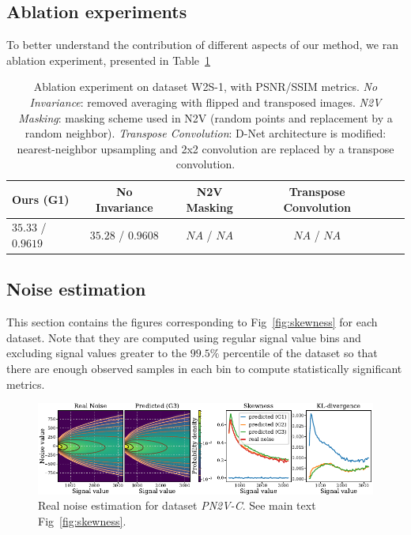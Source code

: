 \documentclass{article}
\begin{document}
\subsection{Ablation experiments}
To better understand the contribution of different aspects of our method, we ran ablation experiment, presented in Table~\ref{si:table:ablation}
\begin{table}[ht]
\caption{Ablation experiment on dataset W2S-1, with PSNR/SSIM metrics.
\textit{No Invariance}: removed averaging with flipped and transposed images.
\textit{N2V Masking}: masking scheme used in N2V (random points and replacement by a random neighbor). \textit{Transpose Convolution}: D-Net architecture is modified: nearest-neighbor upsampling and 2x2 convolution are replaced by a transpose convolution. }
\label{si:table:ablation}
\begin{center}
\begin{sc}
\begin{tabular}{lccccc}
\toprule
Ours (G1) & No Invariance & N2V Masking & Transpose Convolution \\
\midrule
$35.33$ / $0.9619$ & $35.28$ / $0.9608$ & $NA$ / $NA$ & $NA$ / $NA$ \\
\bottomrule
\end{tabular}
\end{sc}
\end{center}
\end{table}

\FloatBarrier
\subsection{Noise estimation}
\label{si:skewness}
This section contains the figures corresponding to Fig~\ref{fig:skewness} for each dataset.
Note that they are computed using regular signal value bins and excluding signal values greater to the $99.5\%$ percentile of the dataset so that there are enough observed samples in each bin to compute statistically significant metrics.

\begin{figure}[ht]
\begin{center}
\centerline{\includegraphics[width=\columnwidth]{fig_skewness_1col_pn2v-C.pdf}}
\caption{Real noise estimation for dataset \textit{PN2V-C}. See main text Fig~\ref{fig:skewness}.
}
\end{center}
\end{figure}
\end{document}
